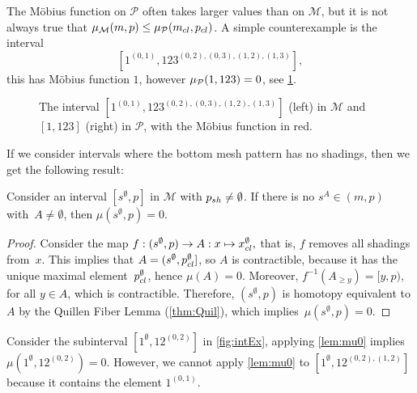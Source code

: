 \documentclass[11pt,a4paper,oneside]{article}
\begin{document}
The M\"obius function on $\mathcal{P}$ often takes larger values than on $\mathcal{M}$,
but it is not always true that $\operatorname{\mu_\mathcal{M}}(m,p)\le
\operatorname{\mu_\mathcal{P}}(m_{cl},p_{cl})$. A simple counterexample is the interval
$$[1^{(0,1)},123^{(0,2),(0,3),(1,2),(1,3)}],$$ this has M\"obius function $1$,
however $\operatorname{\mu_\mathcal{P}}(1,123)=0$, see \cref{fig:1-123}.

\begin{figure}\centering
{}
\caption{The interval $[1^{(0,1)},123^{(0,2),(0,3),(1,2),(1,3)}]$
(left) in $\mathcal{M}$ and $[1,123]$ (right) in $\mathcal{P}$,
with the M\"obius function in red.}\label{fig:1-123}
\end{figure}

If we consider intervals where the bottom mesh pattern has no shadings, then we
get the following result:
\begin{lem}\label{lem:mu0}
Consider an interval $[s^\emptyset,p]$ in $\mathcal{M}$ with $p_{sh}\not=\emptyset$.
If there is no $s^A\in(m,p)$ with~$A\not=\emptyset$, then $\mu(s^\emptyset,p)=0$.
\begin{proof}
Consider the map $f:(s^\emptyset,p)\rightarrow A:x\mapsto x_{cl}^\emptyset,$ that is, $f$ removes all shadings from~$x$.
This implies that ${A=(s^\emptyset,p_{cl}^{\emptyset}]}$, so  $A$ is contractible, because it has the
unique maximal element~$p_{cl}^\emptyset$, hence $\mu(A)=0$. Moreover, $f^{-1}(A_{\ge y})=[y,p)$,
for all $y\in A$, which is contractible. Therefore, $(s^\emptyset,p)$ is homotopy equivalent
to $A$ by the Quillen Fiber Lemma (\cref{thm:Quil}), which implies~$\mu(s^\emptyset,p)=0$.
\end{proof}
\end{lem}
\begin{ex}
Consider the subinterval $[1^\emptyset,12^{(0,2)}]$ in \cref{fig:intEx},
applying \cref{lem:mu0} implies $\mu(1^\emptyset,12^{(0,2)})=0$. However, we cannot
apply \cref{lem:mu0} to $[1^\emptyset,12^{(0,2),(1,2)}]$ because it contains the
element $1^{(0,1)}$.
\end{ex}
\end{document}
